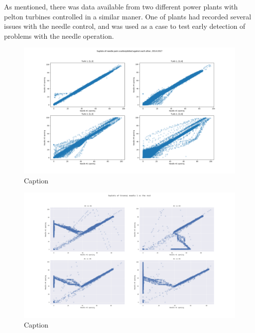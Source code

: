     As mentioned, there was data available from two different power plants with pelton turbines controlled in a similar maner. One of plants had recorded several issues with the needle control, and was used as a case to test early detection of problems with the needle operation. 
    
    \begin{figure}
        \centering
        \includegraphics[width=\textwidth]{report/figures/analysis/hjartdola/hjar_scatterplot_all_needels.png}
        \caption{Caption}
        \label{fig:my_label}
    \end{figure}
    
    
    \begin{figure}
        \centering
        \includegraphics[width=\textwidth]{report/figures/analysis/grunnai/grun_scatterplot_1_vs_rest.png}
        \caption{Caption}
        \label{fig:my_label}
    \end{figure}
    

